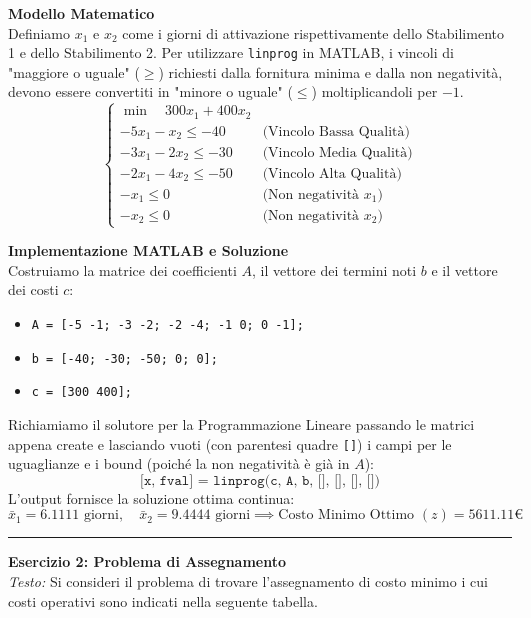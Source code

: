 \documentclass[12pt, a4paper]{article}
\begin{document}
	\textbf{Modello Matematico}\\
	Definiamo $x_1$ e $x_2$ come i giorni di attivazione rispettivamente dello Stabilimento 1 e dello Stabilimento 2. Per utilizzare \texttt{linprog} in MATLAB, i vincoli di "maggiore o uguale" ($\geq$) richiesti dalla fornitura minima e dalla non negatività, devono essere convertiti in "minore o uguale" ($\leq$) moltiplicandoli per $-1$.
	\[
	\begin{cases}
		\min \quad 300x_1 + 400x_2 \\[6pt]
		-5x_1 - x_2 \leq -40 \quad &\text{(Vincolo Bassa Qualità)} \\
		-3x_1 - 2x_2 \leq -30 \quad &\text{(Vincolo Media Qualità)} \\
		-2x_1 - 4x_2 \leq -50 \quad &\text{(Vincolo Alta Qualità)} \\
		-x_1 \leq 0 \quad &\text{(Non negatività $x_1$)} \\
		-x_2 \leq 0 \quad &\text{(Non negatività $x_2$)}
	\end{cases}
	\]
	
	\textbf{Implementazione MATLAB e Soluzione}\\
	Costruiamo la matrice dei coefficienti $A$, il vettore dei termini noti $b$ e il vettore dei costi $c$:
	\begin{itemize}[label=$\circ$, itemsep=2pt, leftmargin=1.5cm]
		\item \texttt{A = [-5 -1; -3 -2; -2 -4; -1 0; 0 -1];}
		\item \texttt{b = [-40; -30; -50; 0; 0];}
		\item \texttt{c = [300 400];}
	\end{itemize}
	Richiamiamo il solutore per la Programmazione Lineare passando le matrici appena create e lasciando vuoti (con parentesi quadre \texttt{[]}) i campi per le uguaglianze e i bound (poiché la non negatività è già in $A$):
	\[
	\texttt{[x, fval] = linprog(c, A, b, [], [], [], [])}
	\]
	L'output fornisce la soluzione ottima continua:
	\[
	\bar{x}_1 = 6.1111 \text{ giorni}, \quad \bar{x}_2 = 9.4444 \text{ giorni} \implies \text{Costo Minimo Ottimo } (z) = \mathbf{5611.11 €}
	\]
	
	\vspace{0.6cm}
	\hrule
	\vspace{0.4cm}
	
	\textbf{Esercizio 2: Problema di Assegnamento}\\
	\textit{Testo:} Si consideri il problema di trovare l'assegnamento di costo minimo i cui costi operativi sono indicati nella seguente tabella.
	
\end{document}
